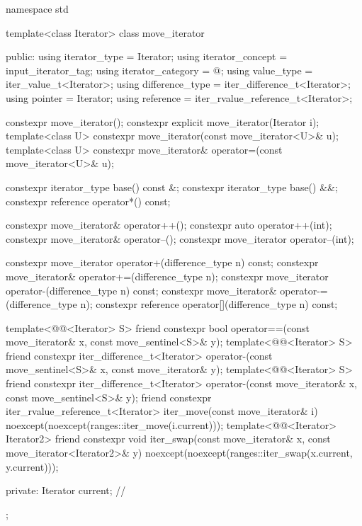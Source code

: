 %
\begin{codeblock}
namespace std {
  template<class Iterator>
  class move_iterator {
  public:
    using iterator_type     = Iterator;
    using iterator_concept  = input_iterator_tag;
    using iterator_category = @\seebelow@;
    using value_type        = iter_value_t<Iterator>;
    using difference_type   = iter_difference_t<Iterator>;
    using pointer           = Iterator;
    using reference         = iter_rvalue_reference_t<Iterator>;

    constexpr move_iterator();
    constexpr explicit move_iterator(Iterator i);
    template<class U> constexpr move_iterator(const move_iterator<U>& u);
    template<class U> constexpr move_iterator& operator=(const move_iterator<U>& u);

    constexpr iterator_type base() const &;
    constexpr iterator_type base() &&;
    constexpr reference operator*() const;

    constexpr move_iterator& operator++();
    constexpr auto operator++(int);
    constexpr move_iterator& operator--();
    constexpr move_iterator operator--(int);

    constexpr move_iterator operator+(difference_type n) const;
    constexpr move_iterator& operator+=(difference_type n);
    constexpr move_iterator operator-(difference_type n) const;
    constexpr move_iterator& operator-=(difference_type n);
    constexpr reference operator[](difference_type n) const;

    template<@@<Iterator> S>
      friend constexpr bool
        operator==(const move_iterator& x, const move_sentinel<S>& y);
    template<@@<Iterator> S>
      friend constexpr iter_difference_t<Iterator>
        operator-(const move_sentinel<S>& x, const move_iterator& y);
    template<@@<Iterator> S>
      friend constexpr iter_difference_t<Iterator>
        operator-(const move_iterator& x, const move_sentinel<S>& y);
    friend constexpr iter_rvalue_reference_t<Iterator>
      iter_move(const move_iterator& i)
        noexcept(noexcept(ranges::iter_move(i.current)));
    template<@@<Iterator> Iterator2>
      friend constexpr void
        iter_swap(const move_iterator& x, const move_iterator<Iterator2>& y)
          noexcept(noexcept(ranges::iter_swap(x.current, y.current)));

  private:
    Iterator current;   // \expos
  };
}
\end{codeblock}


